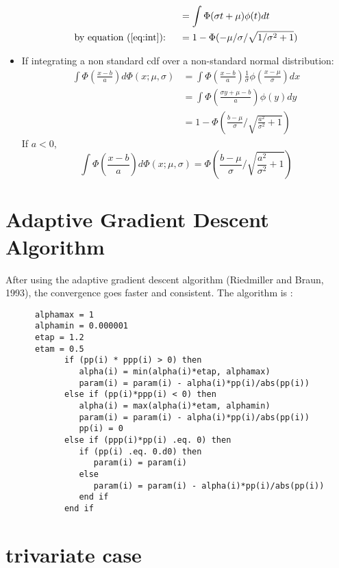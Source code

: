 \documentclass[12pt]{article}
\begin{document}
\begin{itemize}
\begin{align*}
    & = \int \Phi(\sigma t + \mu)\phi(t) dt \\
    \text{by equation (\ref{eq:int}): } \quad & = 1 -
    \Phi(-\mu/\sigma/\sqrt{1/\sigma^2+1})
  \end{align*}
\item If integrating a non standard cdf over a non-standard normal
  distribution:
  \begin{align}
    \int \Phi \left( \frac{x-b}{a} \right) d\Phi(x; \mu, \sigma) & = \int \Phi \left( \frac{x-b}{a} \right) \frac{1}{\sigma} \phi \left( \frac{x-\mu}{\sigma} \right) dx \nonumber\\
    &= \int \Phi \left( \frac{\sigma y + \mu - b}{a}  \right) \phi(y) dy \nonumber \\
    \label{eq:intg1}
    & = 1- \Phi \left( \frac{b-\mu}{\sigma} / \sqrt{\frac{a^2}{\sigma^2}+1} \right)
  \end{align}
  If $a < 0$,
  \begin{equation}
    \label{eq:intg2}
    \int \Phi \left( \frac{x-b}{a} \right) d\Phi(x; \mu, \sigma) = \Phi \left( \frac{b-\mu}{\sigma} / \sqrt{\frac{a^2}{\sigma^2}+1} \right)
  \end{equation}

\end{itemize}

\section{Adaptive Gradient Descent Algorithm}

After using the adaptive gradient descent algorithm (Riedmiller and
Braun, 1993), the convergence goes faster and consistent. The
algorithm is :
\begin{verbatim}
      alphamax = 1
      alphamin = 0.000001
      etap = 1.2
      etam = 0.5
            if (pp(i) * ppp(i) > 0) then
               alpha(i) = min(alpha(i)*etap, alphamax)
               param(i) = param(i) - alpha(i)*pp(i)/abs(pp(i))
            else if (pp(i)*ppp(i) < 0) then
               alpha(i) = max(alpha(i)*etam, alphamin)
               param(i) = param(i) - alpha(i)*pp(i)/abs(pp(i))
               pp(i) = 0
            else if (ppp(i)*pp(i) .eq. 0) then
               if (pp(i) .eq. 0.d0) then
                  param(i) = param(i) 
               else
                  param(i) = param(i) - alpha(i)*pp(i)/abs(pp(i))
               end if
            end if
\end{verbatim}

\section{trivariate case}
\end{document}
